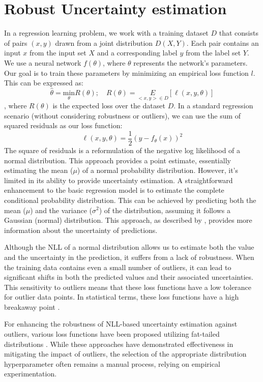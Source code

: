 \documentclass[letterpaper, 10 pt, conference]{ieeeconf}  %
\begin{document}
\section{Robust Uncertainty estimation}
In a regression learning problem, we work with a training dataset $D$ that consists of pairs $(x, y)$ drawn from a joint distribution $D(X, Y)$. Each pair contains an input $x$ from the input set $X$ and a corresponding label $y$ from the label set $Y$.
We use a neural network $f(\theta)$, where $\theta$ represents the network's parameters. Our goal is to train these parameters by minimizing an empirical loss function $l$. This can be expressed as:
\begin{equation*}
\hat{\theta} = \underset{\theta}{\text{min}} R(\theta)  ;\quad  R(\theta) = \underset{<x,y> \in D}{E} [\ell (x,y,\theta)]
\end{equation*}
, where $R(\theta)$ is the expected loss over the dataset $D$.
In a standard regression scenario (without considering robustness or outliers), we can use the sum of squared residuals as our loss function:
\begin{equation*} 
\ell(x,y, \theta) = \frac{1}{2}(y - f_\theta(x))^2
 \end{equation*}   
 The square of residuals is a reformulation of the negative log likelihood of a normal distribution. This approach provides a point estimate, essentially estimating the mean ($\mu$) of a normal probability distribution. However, it's limited in its ability to provide uncertainty estimation. A straightforward enhancement to the basic regression model is to estimate the complete conditional probability distribution. This can be achieved by predicting both the mean ($\mu$) and the variance ($\sigma^{2}$) of the distribution, assuming it follows a Gaussian (normal) distribution. This approach, as described by \cite{nix1994estimating}, provides more information about the uncertainty of predictions.

Although the NLL of a normal distribution allows us to estimate both the value and the uncertainty in the prediction, it suffers from a lack of robustness. When the training data contains even a small number of outliers, it can lead to significant shifts in both the predicted values and their associated uncertainties.
This sensitivity to outliers means that these loss functions have a low tolerance for outlier data points. In statistical terms, these loss functions have a high breakaway point \cite{huber2004robust}.

For enhancing the robustness of NLL-based uncertainty estimation against outliers, various loss functions have been proposed utilizing fat-tailed distributions \cite{nair_laplace_2O22}. While these approaches have demonstrated effectiveness in mitigating the impact of outliers, the selection of the appropriate distribution hyperparameter often remains a manual process, relying on empirical experimentation.
\end{document}
